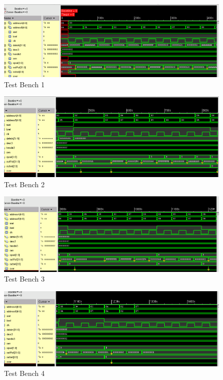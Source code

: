 \documentclass[12pt]{article}
\begin{document}
\begin{figure}[H]
\centering
\includegraphics[width=\linewidth]{../case2/rtl-results1}
\caption{Test Bench 1}
\label{fig:rtl-results1}
\end{figure}
\begin{figure}[H]
\centering
\includegraphics[width=\linewidth]{../case2/rtl-results2}
\caption{Test Bench 2}
\label{fig:rtl-results2}
\end{figure}
\begin{figure}[H]
\centering
\includegraphics[width=\linewidth]{../case2/rtl-results3}
\caption{Test Bench 3}
\label{fig:rtl-results3}
\end{figure}
\begin{figure}[H]
\centering
\includegraphics[width=\linewidth]{../case2/rtl-results4}
\caption{Test Bench 4}
\label{fig:rtl-results4}
\end{figure}
\end{document}
